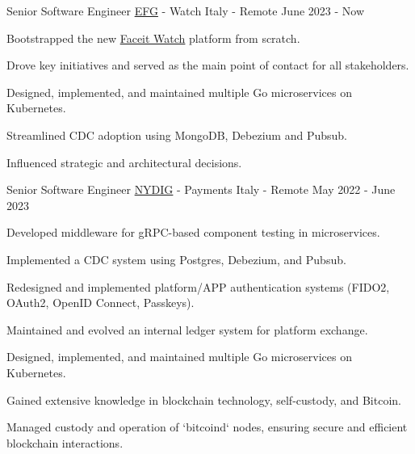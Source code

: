 

\begin{cventries}

  \cventry
    {Senior Software Engineer} %
    {\href{https://eslfaceitgroup.com/}{EFG} - Watch} %
    {Italy - Remote} %
    {June 2023 - Now} %
    {
      \begin{cvitems} %
        \item {Bootstrapped the new \href{https://www.faceit.com/en/watch}{Faceit Watch} platform from scratch.}
        \item {Drove key initiatives and served as the main point of contact for all stakeholders.}
        \item {Designed, implemented, and maintained multiple Go microservices on Kubernetes.}
        \item {Streamlined CDC adoption using MongoDB, Debezium and Pubsub.}
        \item {Influenced strategic and architectural decisions.}
      \end{cvitems}
    }

  \cventry
    {Senior Software Engineer} %
    {\href{https://nydig.com/}{NYDIG} - Payments} %
    {Italy - Remote} %
    {May 2022 - June 2023} %
    {
      \begin{cvitems} %
        \item {Developed middleware for gRPC-based component testing in microservices.}
        \item {Implemented a CDC system using Postgres, Debezium, and Pubsub.}
        \item {Redesigned and implemented platform/APP authentication systems (FIDO2, OAuth2, OpenID Connect, Passkeys).}
        \item {Maintained and evolved an internal ledger system for platform exchange.}
        \item {Designed, implemented, and maintained multiple Go microservices on Kubernetes.}
        \item {Gained extensive knowledge in blockchain technology, self-custody, and Bitcoin.}
        \item {Managed custody and operation of `bitcoind` nodes, ensuring secure and efficient blockchain interactions.}
      \end{cvitems}
    }



\end{cventries}
